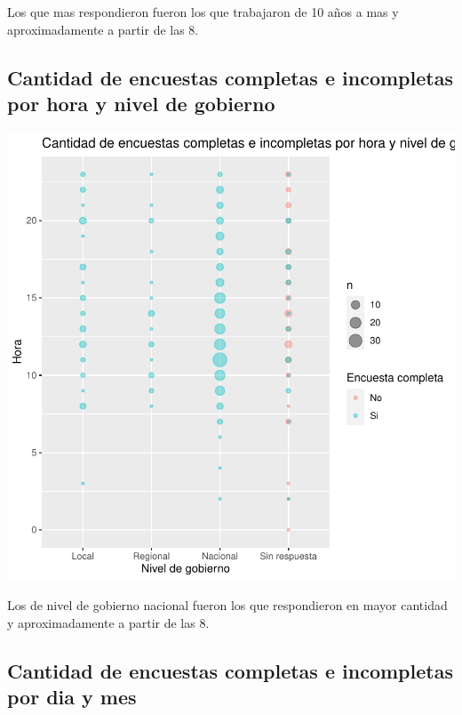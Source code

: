 \documentclass{article}
\begin{document}
Los que mas respondieron fueron los que trabajaron de 10 años a mas y aproximadamente a partir de las 8.

\subsection{Cantidad de encuestas completas e incompletas por hora y nivel de gobierno}

\includegraphics{seguimientov3-076}

Los de nivel de gobierno nacional fueron los que respondieron en mayor cantidad y aproximadamente a partir de las 8.

\subsection{Cantidad de encuestas completas e incompletas por dia y mes}
\end{document}
